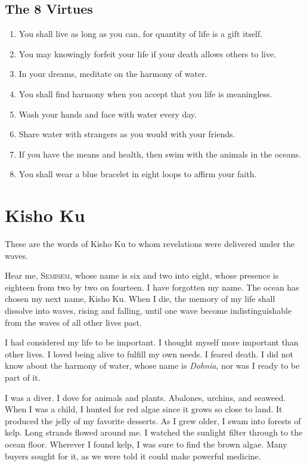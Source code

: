 \documentclass[12pt, letterpaper]{report}
\begin{document}
\section{The 8 Virtues}

\begin{enumerate}
  \item You shall live as long as you can, for quantity of life is a gift itself.
  \item You may knowingly forfeit your life if your death allows others to live.
  \item In your dreams, meditate on the harmony of water.
  \item You shall find harmony when you accept that you life is meaningless.
  \item Wash your hands and face with water every day.
  \item Share water with strangers as you would with your friends.
  \item If you have the means and health, then swim with the animals in the oceans.
  \item You shall wear a blue bracelet in eight loops to affirm your faith.
\end{enumerate}

\chapter{Kisho Ku}

These are the words of Kisho Ku to whom revelations were delivered under the waves.

\vspace{1\baselineskip}
Hear me, S\textsc{emisem}, whose name is six and two into eight, whose presence is eighteen from two by two on fourteen. I have forgotten my name. The ocean has chosen my next name, Kisho Ku. When I die, the memory of my life shall dissolve into waves, rising and falling, until one wave become indistinguishable from the waves of all other lives past. 

\vspace{1\baselineskip}
I had considered my life to be important. I thought myself more important than other lives. I loved being alive to fulfill my own needs. I feared death. I did not know about the harmony of water, whose name is \textit{Dohnia}, nor was I ready to be part of it.

\vspace{1\baselineskip}
I was a diver. I dove for animals and plants. Abalones, urchins, and seaweed. When I was a child, I hunted for red algae since it grows so close to land. It produced the jelly of my favorite desserts. As I grew older, I swam into forests of kelp. Long strands flowed around me. I watched the sunlight filter through to the ocean floor. Wherever I found kelp, I was sure to find the brown algae. Many buyers sought for it, as we were told it could make powerful medicine. 
\end{document}
